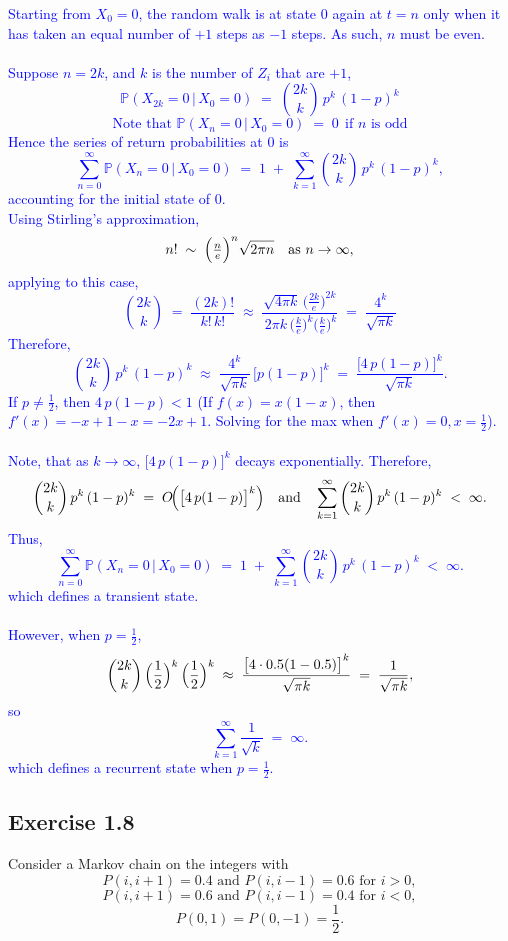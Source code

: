 \documentclass{article}
\begin{document}
    \textcolor{blue}{
Starting from \(X_0 = 0\), the random walk is at state \(0\) again at \(t=n\) only when it has taken an equal number of \(+1\) steps as \(-1\) steps. As such, \(n\) must be even. \\ \\ Suppose \(n = 2k\), and \(k\) is the number of \(Z_i\) that are \(+1\),
\[
  \mathbb{P}(X_{2k} = 0 \,\big\vert\, X_0 = 0)
  \;=\;
  \binom{2k}{k}\, p^k\, (1-p)^k
\]
\[
    \text{Note that }\mathbb{P}(X_n = 0 \,\big\vert\, X_0 = 0) \;=\; 0
  \ \ \text{if $n$ is odd}
\]
Hence the series of return probabilities at \(0\) is
\[
  \sum_{n=0}^\infty \mathbb{P}(X_n = 0 \,\big\vert\, X_0 = 0)
  \;=\;
  1 \;+\; \sum_{k=1}^\infty \binom{2k}{k}\, p^k\, (1-p)^k,
\]
accounting for the initial state of 0. \\ Using Stirling's approximation,
\medskip
\noindent
\[
  n! \;\sim\; \Bigl(\tfrac{n}{e}\Bigr)^{n}\sqrt{2\pi n}
  \quad\text{as }n \to \infty,
\]
applying to this case,
\[
  \binom{2k}{k}
  \;=\;
  \frac{(2k)!}{k!\,k!}
  \;\approx\;
  \frac{\sqrt{4\pi k}\,\bigl(\tfrac{2k}{e}\bigr)^{2k}}{\,2\pi k\,\bigl(\tfrac{k}{e}\bigr)^{k}\bigl(\tfrac{k}{e}\bigr)^{k}}
  \;=\;
  \frac{4^k}{\sqrt{\pi k}}
\]
Therefore,
\[
  \binom{2k}{k}\,p^k\,(1-p)^k
  \;\approx\;
  \frac{4^k}{\sqrt{\pi k}} \,\bigl[p(1-p)\bigr]^k
  \;=\;
  \frac{\bigl[4\,p(1-p)\bigr]^k}{\sqrt{\pi k}}.
\]
\medskip
\noindent
If $p \neq \frac{1}{2}$, then \(4\,p(1-p) < 1\) (If $f(x)=x(1-x)$, then $f'(x)=-x+1-x=-2x+1$. Solving for the max when $f'(x)=0, x=\frac{1}{2}$). \\ \\ 
Note, that as \(k \to \infty\), \(\bigl[4\,p(1-p)\bigr]^k\) decays exponentially. Therefore,
\[
  \binom{2k}{k}\,p^k\,(1-p)^k
  \;=\;
  O\!\Bigl(\bigl[4\,p(1-p)\bigr]^k\Bigr)
  \quad
  \text{and}
  \quad
  \sum_{k=1}^{\infty} \binom{2k}{k}\,p^k\,(1-p)^k
  \;<\;\infty.
\]
Thus,
\[
  \sum_{n=0}^\infty \mathbb{P}(X_n = 0 \,\big\vert\, X_0 = 0)
  \;=\;
  1 \;+\;
  \sum_{k=1}^{\infty}
  \binom{2k}{k}\, p^k\,(1-p)^k
  \;<\;
  \infty.
\]
which defines a transient state. \\ \\ 
\medskip
\noindent
However, when \(p = \frac{1}{2}\),
\[
  \binom{2k}{k}\,\Bigl(\frac12\Bigr)^k\,\Bigl(\frac12\Bigr)^k
  \;\approx\;
    \frac{\bigl[4\cdot 0.5(1-0.5)\bigr]^k}{\sqrt{\pi k}}
  \;=\;
  \frac{1}{\sqrt{\pi k}},
\]
so
\[
  \sum_{k=1}^\infty \frac{1}{\sqrt{k}}
  \;=\;
  \infty.
\]
which defines a recurrent state when $p=\frac12$. }

    \subsection*{Exercise 1.8} Consider a Markov chain on the integers with
\[
P(i, i+1) = 0.4 \text{ and } P(i, i-1) = 0.6 \text{ for } i > 0,
\]
\[
P(i, i+1) = 0.6 \text{ and } P(i, i-1) = 0.4 \text{ for } i < 0,
\]
\[
P(0,1) = P(0,-1) = \frac{1}{2}.
\]
\end{document}
